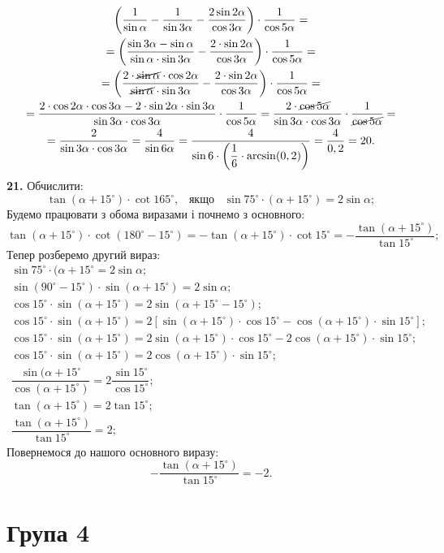 \begin{multline*}
\left(\dfrac{1}{\sin\alpha}-\dfrac{1}{\sin3\alpha}-\dfrac{2\sin2\alpha}{\cos3\alpha}\right)\cdot\dfrac{1}{\cos5\alpha}=\\
=\left(\dfrac{\sin3\alpha-\sin\alpha}{\sin\alpha\cdot\sin3\alpha}-\dfrac{2\cdot\sin2\alpha}{\cos3\alpha}\right)\cdot\dfrac{1}{\cos5\alpha}=\\
=\left(\dfrac{2\cdot\cancel{\sin\alpha}\cdot\cos2\alpha}{\cancel{\sin\alpha}\cdot\sin3\alpha}-\dfrac{2\cdot\sin2\alpha}{\cos3\alpha}\right)\cdot\dfrac{1}{\cos5\alpha}=\\
=\dfrac{2\cdot\cos2\alpha\cdot\cos3\alpha-2\cdot\sin2\alpha\cdot\sin3\alpha}{\sin3\alpha\cdot\cos3\alpha}\cdot\dfrac{1}{\cos5\alpha}=
\dfrac{2\cdot\cancel{\cos5\alpha}}{\sin3\alpha\cdot\cos3\alpha}\cdot\dfrac{1}{\cancel{\cos5\alpha}}=\\
=\dfrac{2}{\sin3\alpha\cdot\cos3\alpha}=
\dfrac{4}{\sin6\alpha}=
\dfrac{4}{\sin6\cdot\left(\dfrac{1}{6}\cdot\arcsin(0,2)\right)}=
\dfrac{4}{0,2}=20.
\end{multline*}
\textbf{21.} Обчислити:
$$
\tan(\alpha+15^{\circ})\cdot\cot165^{\circ}, \;\;\; \mbox{якщо} \;\;\; \sin75^{\circ}\cdot(\alpha+15^{\circ})=2\sin\alpha;
$$
Будемо працювати з обома виразами і почнемо з основного:
$$
\tan(\alpha+15^{\circ})\cdot\cot(180^{\circ}-15^{\circ})=
-\tan(\alpha+15^{\circ})\cdot\cot15^{\circ}=
-\dfrac{\tan(\alpha+15^{\circ})}{\tan15^{\circ}};
$$
Тепер розберемо другий вираз:
\begin{gather*}
\sin75^{\circ}\cdot(\alpha+15^{\circ}=2\sin\alpha;\\
\sin(90^{\circ}-15^{\circ})\cdot\sin(\alpha+15^{\circ})=2\sin\alpha;\\
\cos15^{\circ}\cdot\sin(\alpha+15^{\circ})=2\sin(\alpha+15^{\circ}-15^{\circ});\\
\cos15^{\circ}\cdot\sin(\alpha+15^{\circ})=
2[\sin(\alpha+15^{\circ})\cdot\cos15^{\circ}-\cos(\alpha+15^{\circ})\cdot\sin15^{\circ}];\\
\cos15^{\circ}\cdot\sin(\alpha+15^{\circ})=
2\sin(\alpha+15^{\circ})\cdot\cos15^{\circ}-2\cos(\alpha+15^{\circ})\cdot\sin15^{\circ};\\
\cos15^{\circ}\cdot\sin(\alpha+15^{\circ})=2\cos(\alpha+15^{\circ})\cdot\sin15^{\circ};\\
\dfrac{\sin(\alpha+15^{\circ}}{\cos(\alpha+15^{\circ})}=2\dfrac{\sin15^{\circ}}{\cos15^{\circ}};\\
\tan(\alpha+15^{\circ})=2\tan15^{\circ};\\
\dfrac{\tan(\alpha+15^{\circ})}{\tan15^{\circ}}=2;
\end{gather*}
Повернемося до нашого основного виразу:
$$
-\dfrac{\tan(\alpha+15^{\circ})}{\tan15^{\circ}}=-2.
$$
\section*{Група 4}